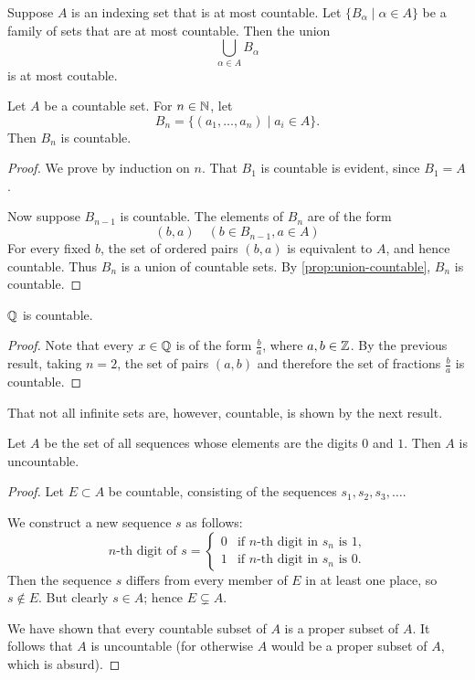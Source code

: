 \begin{corollary}
Suppose $A$ is an indexing set that is at most countable. Let $\{B_\alpha\mid\alpha\in A\}$ be a family of sets that are at most countable. Then the union
\[\bigcup_{\alpha\in A}B_\alpha\]
is at most coutable.
\end{corollary}

\begin{proposition}
Let $A$ be a countable set. For $n\in\mathbb N$, let
\[B_n=\{(a_1,\dots,a_n)\mid a_i\in A\}.\]
Then $B_n$ is countable.
\end{proposition}

\begin{proof}
We prove by induction on $n$. That $B_1$ is countable is evident, since $B_1=A$.

Now suppose $B_{n-1}$ is countable. The elements of $B_n$ are of the form 
\[(b,a)\quad(b\in B_{n-1},a\in A)\]
For every fixed $b$, the set of ordered pairs $(b,a)$ is equivalent to $A$, and hence countable. Thus $B_n$ is a union of countable sets. By \cref{prop:union-countable}, $B_n$ is countable.
\end{proof}

\begin{corollary}
$\mathbb Q$ is countable.
\end{corollary}

\begin{proof}
Note that every $x\in\mathbb Q$ is of the form $\frac{b}{a}$, where $a,b\in\mathbb Z$. By the previous result, taking $n=2$, the set of pairs $(a,b)$ and therefore the set of fractions $\frac{b}{a}$ is countable.
\end{proof}

That not all infinite sets are, however, countable, is shown by the next result.

\begin{proposition}
Let $A$ be the set of all sequences whose elements are the digits $0$ and $1$. Then $A$ is uncountable. 
\end{proposition}

\begin{proof}
Let $E\subset A$ be countable, consisting of the sequences $s_1,s_2,s_3,\dots$.

We construct a new sequence $s$ as follows:
\[\text{$n$-th digit of $s$}=\begin{cases}
0&\text{if $n$-th digit in $s_n$ is $1$,}\\
1&\text{if $n$-th digit in $s_n$ is $0$.}
\end{cases}\]
Then the sequence $s$ differs from every member of $E$ in at least one place, so $s\notin E$. But clearly $s\in A$; hence $E\subsetneq A$.

We have shown that every countable subset of $A$ is a proper subset of $A$. It follows that $A$ is uncountable (for otherwise $A$ would be a proper subset of $A$, which is absurd).
\end{proof}

